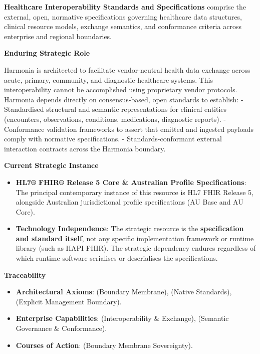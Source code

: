 \textbf{Healthcare Interoperability Standards and Specifications} comprise the external, open, normative specifications governing healthcare data structures, clinical resource models, exchange semantics, and conformance criteria across enterprise and regional boundaries.



\par\medskip\textbf{Enduring Strategic Role}\par


Harmonia is architected to facilitate vendor-neutral health data exchange across acute, primary, community, and diagnostic healthcare systems. This interoperability cannot be accomplished using proprietary vendor protocols. Harmonia depends directly on consensus-based, open standards to establish:
- Standardised structural and semantic representations for clinical entities (encounters, observations, conditions, medications, diagnostic reports).
- Conformance validation frameworks to assert that emitted and ingested payloads comply with normative specifications.
- Standards-conformant external interaction contracts across the Harmonia boundary.



\par\medskip\textbf{Current Strategic Instance}\par


\begin{itemize}


\item \textbf{HL7® FHIR® Release 5 Core \& Australian Profile Specifications}: The principal contemporary instance of this resource is HL7 FHIR Release 5, alongside Australian jurisdictional profile specifications (AU Base and AU Core).

\item \textbf{Technology Independence}: The strategic resource is the \textbf{specification and standard itself}, not any specific implementation framework or runtime library (such as HAPI FHIR). The strategic dependency endures regardless of which runtime software serialises or deserialises the specifications.

\end{itemize}


\par\medskip\textbf{Traceability}\par


\begin{itemize}


\item \textbf{Architectural Axioms}: \texttt{} (Boundary Membrane), \texttt{} (Native Standards), \texttt{} (Explicit Management Boundary).

\item \textbf{Enterprise Capabilities}: \texttt{} (Interoperability \& Exchange), \texttt{} (Semantic Governance \& Conformance).

\item \textbf{Courses of Action}: \texttt{} (Boundary Membrane Sovereignty).

\end{itemize}

